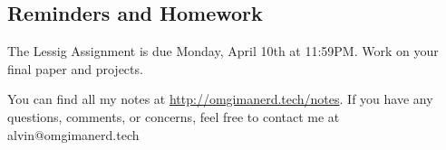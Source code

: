 \documentclass[letterpaper, 12pt]{article}
\begin{document}
\subsection*{Reminders and Homework}
The Lessig Assignment is due Monday, April 10th at 11:59PM.
Work on your final paper and projects.

\begin{center}
  You can find all my notes at \url{http://omgimanerd.tech/notes}. If you have
  any questions, comments, or concerns, feel free to contact me at
  alvin@omgimanerd.tech
\end{center}
\end{document}
